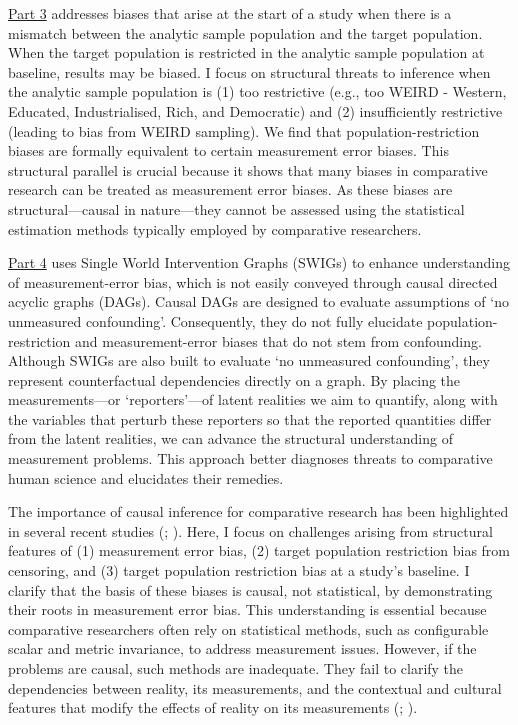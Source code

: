 \documentclass[
  single column]{article}
\begin{document}
\hyperref[id-sec-3]{Part 3} addresses biases that arise at the start of
a study when there is a mismatch between the analytic sample population
and the target population. When the target population is restricted in
the analytic sample population at baseline, results may be biased. I
focus on structural threats to inference when the analytic sample
population is (1) too restrictive (e.g., too WEIRD - Western, Educated,
Industrialised, Rich, and Democratic) and (2) insufficiently restrictive
(leading to bias from WEIRD sampling). We find that
population-restriction biases are formally equivalent to certain
measurement error biases. This structural parallel is crucial because it
shows that many biases in comparative research can be treated as
measurement error biases. As these biases are structural---causal in
nature---they cannot be assessed using the statistical estimation
methods typically employed by comparative researchers.

\hyperref[id-sec-4]{Part 4} uses Single World Intervention Graphs
(SWIGs) to enhance understanding of measurement-error bias, which is not
easily conveyed through causal directed acyclic graphs (DAGs). Causal
DAGs are designed to evaluate assumptions of `no unmeasured
confounding'. Consequently, they do not fully elucidate
population-restriction and measurement-error biases that do not stem
from confounding. Although SWIGs are also built to evaluate `no
unmeasured confounding', they represent counterfactual dependencies
directly on a graph. By placing the measurements---or `reporters'---of
latent realities we aim to quantify, along with the variables that
perturb these reporters so that the reported quantities differ from the
latent realities, we can advance the structural understanding of
measurement problems. This approach better diagnoses threats to
comparative human science and elucidates their remedies.

The importance of causal inference for comparative research has been
highlighted in several recent studies
(;
). Here, I focus
on challenges arising from structural features of (1) measurement error
bias, (2) target population restriction bias from censoring, and (3)
target population restriction bias at a study's baseline. I clarify that
the basis of these biases is causal, not statistical, by demonstrating
their roots in measurement error bias. This understanding is essential
because comparative researchers often rely on statistical methods, such
as configurable scalar and metric invariance, to address measurement
issues. However, if the problems are causal, such methods are
inadequate. They fail to clarify the dependencies between reality, its
measurements, and the contextual and cultural features that modify the
effects of reality on its measurements
(;
).
\end{document}
